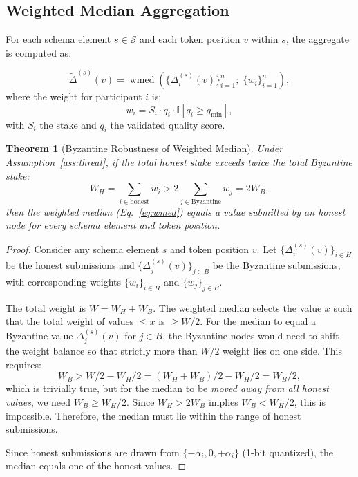 \documentclass[11pt]{article}
\newtheorem{theorem}{Theorem}
\DeclareMathOperator{\wmed}{wmed}
\begin{document}
\subsection{Weighted Median Aggregation}

For each schema element $s \in \mathcal{S}$ and each token position $v$ within
$s$, the aggregate is computed as:

\begin{equation}
    \tilde{\Delta}^{(s)}(v) = \wmed\left(\{\Delta_i^{(s)}(v)\}_{i=1}^n; \; \{w_i\}_{i=1}^n\right),
    \label{eq:wmed}
\end{equation}
where the weight for participant $i$ is:
\begin{equation}
    w_i = S_i \cdot q_i \cdot \mathbb{I}[q_i \geq q_{\min}],
    \label{eq:weights}
\end{equation}
with $S_i$ the stake and $q_i$ the validated quality score.

\begin{theorem}[Byzantine Robustness of Weighted Median]
\label{thm:byz-robust}
Under Assumption~\ref{ass:threat}, if the total honest stake exceeds twice the
total Byzantine stake:
\begin{equation}
    W_H = \sum_{i \in \text{honest}} w_i > 2 \sum_{j \in \text{Byzantine}} w_j = 2W_B,
\end{equation}
then the weighted median (Eq.~\ref{eq:wmed}) equals a value submitted by an
honest node for every schema element and token position.
\end{theorem}

\begin{proof}
Consider any schema element $s$ and token position $v$. Let
$\{\Delta_i^{(s)}(v)\}_{i \in H}$ be the honest submissions and
$\{\Delta_j^{(s)}(v)\}_{j \in B}$ be the Byzantine submissions, with
corresponding weights $\{w_i\}_{i \in H}$ and $\{w_j\}_{j \in B}$.

The total weight is $W = W_H + W_B$. The weighted median selects the value $x$
such that the total weight of values $\leq x$ is $\geq W/2$. For the median
to equal a Byzantine value $\Delta_j^{(s)}(v)$ for $j \in B$, the Byzantine
nodes would need to shift the weight balance so that strictly more than $W/2$
weight lies on one side. This requires:
\begin{equation}
    W_B > W/2 - W_H/2 = (W_H + W_B)/2 - W_H/2 = W_B/2,
\end{equation}
which is trivially true, but for the median to be \emph{moved away from all
honest values}, we need $W_B \geq W_H/2$. Since $W_H > 2W_B$ implies
$W_B < W_H/2$, this is impossible. Therefore, the median must lie within the
range of honest submissions.

Since honest submissions are drawn from $\{-\alpha_i, 0, +\alpha_i\}$ (1-bit
quantized), the median equals one of the honest values.
\end{proof}
\end{document}
